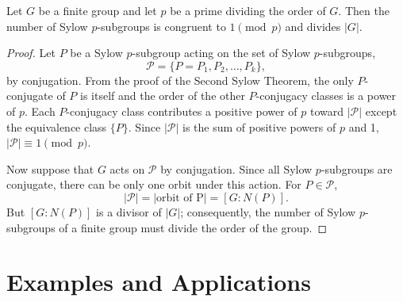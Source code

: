  
\begin{theorem}
Let $G$ be a finite group and let $p$ be a prime dividing the order of
$G$.  Then the number of Sylow $p$-subgroups is congruent to $1
\pmod{p}$ and divides $|G|$. 
\end{theorem}
 
 
\begin{proof}
Let $P$ be a Sylow $p$-subgroup acting on the set of Sylow
$p$-subgroups, 
\[
{\mathcal P} = \{ P = P_1, P_2, \ldots, P_k \},
\]
by conjugation. From the proof of the Second Sylow Theorem, the only
$P$-conjugate of $P$ is itself and the order of the other
$P$-conjugacy classes is a power of $p$. Each $P$-conjugacy class
contributes a positive power of $p$ toward $|{\mathcal P}|$ except the
equivalence class  $\{ P \}$. Since $|{\mathcal P}|$ is the sum of
positive powers of $p$ and 1, $|{\mathcal P}| \equiv 1 \pmod{p}$.
 
 
Now suppose that $G$ acts on ${\mathcal P}$ by conjugation. Since all
Sylow $p$-subgroups are conjugate, there can be only one orbit under
this action. For $P \in {\mathcal P}$, 
\[
|{\mathcal P}| = |\mbox{orbit of P}| = [G : N(P)].
\]
But $[G : N(P)]$ is a divisor of $|G|$; consequently, the number of
Sylow \mbox{$p$-subgroups} of a finite group must divide the order of the
group. 
\end{proof}
 
 
 
\histhead 
 
 
 
 
 
\section{Examples and Applications}
 
